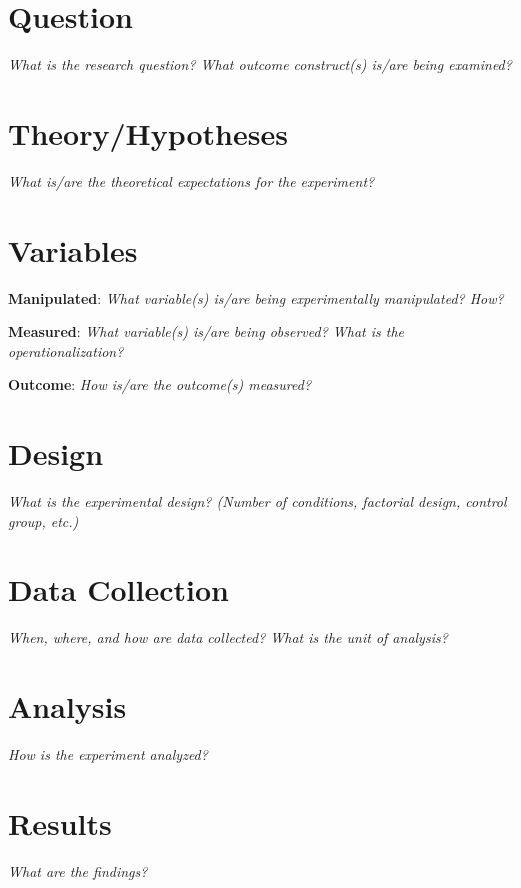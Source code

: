 \documentclass[12pt,a4]{article}
\begin{document}
\thispagestyle{empty}

\section*{Question}
{\em What is the research question? What outcome construct(s) is/are being examined?}

\section*{Theory/Hypotheses}
{\em What is/are the theoretical expectations for the experiment?}

\vspace{1em}
\section*{Variables}

\noindent \textbf{Manipulated}: {\em What variable(s) is/are being experimentally manipulated? How?}
\vspace{6ex}

\noindent \textbf{Measured}: {\em What variable(s) is/are being observed? What is the operationalization?}
\vspace{6ex}

\noindent \textbf{Outcome}: {\em How is/are the outcome(s) measured?}


\section*{Design}
{\em What is the experimental design? (Number of conditions, factorial design, control group, etc.)}


\vspace{2em}
\section*{Data Collection}
{\em When, where, and how are data collected? What is the unit of analysis?}


\vspace{2em}
\section*{Analysis}
{\em How is the experiment analyzed?}

\vspace{2em}
\section*{Results}
{\em What are the findings?}
\end{document}
